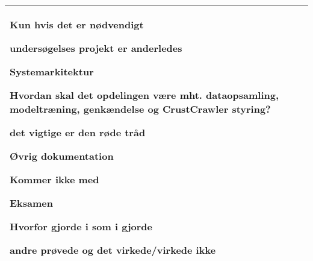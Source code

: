 \begin{center}
\begin{tabular}{| l | p{10cm} |}
\begin{myEnumerate}
\begin{myItemize}
				\item Kun hvis det er nødvendigt
				\item undersøgelses projekt er anderledes
			\end{myItemize}
			\item Systemarkitektur
			\begin{myItemize}
				\item Hvordan skal det opdelingen være mht. dataopsamling, modeltræning, genkændelse og CrustCrawler styring?
				\item det vigtige er den røde tråd
			\end{myItemize}
			\item Øvrig dokumentation
			\begin{myItemize}
				\item Kommer ikke med
			\end{myItemize}
			\item Eksamen
			\begin{myItemize}
				\item Hvorfor gjorde i som i gjorde
				\begin{myItemize}
					\item andre prøvede og det virkede/virkede ikke
				\end{myItemize}
			\end{myItemize}
		\end{myEnumerate}\\ 	
		\hline
	\end{tabular}
\end{center}

